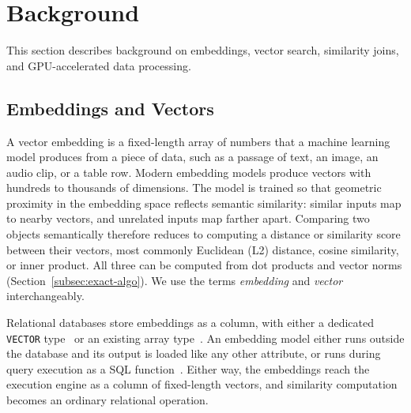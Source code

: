 \section{Background}\label{sec:background}



This section describes background on embeddings, vector search, similarity joins, and GPU-accelerated data processing.

\subsection{Embeddings and Vectors}\label{subsec:embeddings-and-vectors}

A vector embedding is a fixed-length array of numbers that a machine learning model produces from a piece of data, such as a passage of text, an image, an audio clip, or a table row.
Modern embedding models produce vectors with hundreds to thousands of dimensions.
The model is trained so that geometric proximity in the embedding space reflects semantic similarity: similar inputs map to nearby vectors, and unrelated inputs map farther apart.
Comparing two objects semantically therefore reduces to computing a distance or similarity score between their vectors, most commonly Euclidean (L2) distance, cosine similarity, or inner product.
All three can be computed from dot products and vector norms (Section~\ref{subsec:exact-algo}).
We use the terms \emph{embedding} and \emph{vector} interchangeably.

Relational databases store embeddings as a column, with either a dedicated \texttt{VECTOR} type~\cite{PgvectorRepo, SnowflakeVector, SQLServer2025Vector, MySQLHeatWaveVector} or an existing array type~\cite{DuckDBVSS, ClickHouseVSS, BigQueryVectorSearchFn, DatabricksNearestByJoinBlog26}.
An embedding model either runs outside the database and its output is loaded like any other attribute, or runs during query execution as a SQL function~\cite{SnowflakeAIEmbed, BigQueryGenerateEmbedding, HeatWaveMLEmbedRow, SQLServerAIGenerateEmbeddings, DatabricksAIQuery26, PgVectorizeRepo, DuckDBQuackformers}.
Either way, the embeddings reach the execution engine as a column of fixed-length vectors, and similarity computation becomes an ordinary relational operation.

